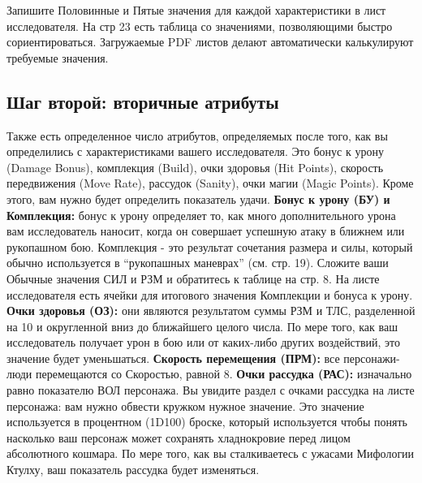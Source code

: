 \documentclass[letterpaper,twocolumn,openany, twoside, 11pt, usenames]{cocbook}
\begin{document}
Запишите Половинные и Пятые значения для каждой характеристики в лист исследователя. На стр 23 есть таблица со значениями, позволяющими быстро сориентироваться. Загружаемые PDF листов делают автоматически калькулируют требуемые значения.

\subsection*{Шаг второй: вторичные атрибуты}

Также есть определенное число атрибутов, определяемых после того, как вы определились с характеристиками вашего исследователя. Это бонус к урону (Damage Bonus), комплекция (Build), очки здоровья (Hit Points), скорость передвижения (Move Rate), рассудок (Sanity), очки магии (Magic Points). Кроме этого, вам нужно будет определить показатель удачи.
\smallbreak
\noindent \textbf{Бонус к урону (БУ) и Комплекция:} бонус к урону определяет то, как много дополнительного урона вам исследователь наносит, когда он совершает успешную атаку в ближнем или рукопашном бою. Комплекция - это результат сочетания размера и силы, который обычно используется в ``рукопашных маневрах'' (см. стр. 19). Сложите ваши Обычные значения СИЛ и РЗМ и обратитесь к таблице на стр. 8. На листе исследователя есть ячейки для итогового значения Комплекции и бонуса к урону.
\smallbreak
\noindent \textbf{Очки здоровья (ОЗ):} они являются результатом суммы РЗМ и ТЛС, разделенной на 10 и округленной вниз до ближайшего целого числа. По мере того, как ваш исследователь получает урон в бою или от каких-либо других воздействий, это значение будет уменьшаться.
\smallbreak
\noindent {}
\smallbreak
\noindent \textbf{Скорость перемещения (ПРМ):} все персонажи-люди перемещаются со Скоростью, равной 8.
\smallbreak
\noindent \textbf{Очки рассудка (РАС):} изначально равно показателю ВОЛ персонажа. Вы увидите раздел с очками рассудка на листе персонажа: вам нужно обвести кружком нужное значение. Это значение используется в процентном (1D100) броске, который используется чтобы понять насколько ваш персонаж может сохранять хладнокровие перед лицом абсолютного кошмара. По мере того, как вы сталкиваетесь с ужасами Мифологии Ктулху, ваш показатель рассудка будет изменяться.
\smallbreak
\noindent {}
\end{document}

